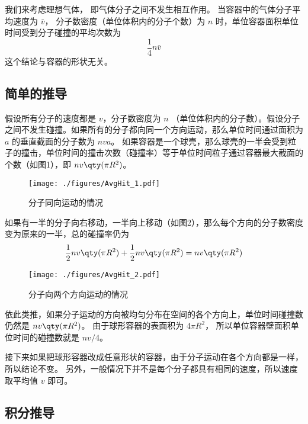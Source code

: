 
\begin{issues}
\issueTODO
\end{issues}


我们来考虑理想气体， 即气体分子之间不发生相互作用。 当容器中的气体分子平均速度为 $\bar v$， 分子数密度（单位体积内的分子个数）为 $n$ 时，单位容器面积单位时间受到分子碰撞的平均次数为
\begin{equation}
\frac14 n\bar v
\end{equation}
这个结论与容器的形状无关。

\subsection{简单的推导}

假设所有分子的速度都是 $v$，分子数密度为 $n$ （单位体积内的分子数）。假设分子之间不发生碰撞。如果所有的分子都向同一个方向运动，那么单位时间通过面积为 $a$ 的垂直截面的分子数为 $nva$。 如果容器是一个球壳，那么球壳的一半会受到粒子的撞击，单位时间的撞击次数（碰撞率）等于单位时间粒子通过容器最大截面的个数（如图1），即 $nv \qty(\pi R^2)$。 
\begin{figure}[ht]
\centering
\texttt{[image: ./figures/AvgHit\_1.pdf]}
\caption{分子同向运动的情况} \label{AvgHit_fig1}
\end{figure}
如果有一半的分子向右移动，一半向上移动（如图2），那么每个方向的分子数密度变为原来的一半，总的碰撞率仍为
\begin{equation}
\frac12 nv \qty(\pi R^2) + \frac12 nv \qty(\pi R^2) = nv \qty(\pi R^2)
\end{equation}

\begin{figure}[ht]
\centering
\texttt{[image: ./figures/AvgHit\_2.pdf]}
\caption{分子向两个方向运动的情况} \label{AvgHit_fig2}
\end{figure}
依此类推，如果分子运动的方向被均匀分布在空间的各个方向上，单位时间碰撞数仍然是 $nv \qty(\pi R^2)$。
由于球形容器的表面积为 $4\pi R^2$， 所以单位容器壁面积单位时间的碰撞数就是 $nv/4$。 

接下来如果把球形容器改成任意形状的容器，由于分子运动在各个方向都是一样，所以结论不变。 另外，一般情况下并不是每个分子都具有相同的速度，所以速度取平均值 $v$ 即可。

\subsection{积分推导}
